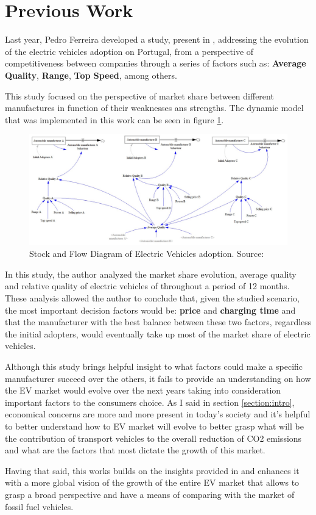 \section{Previous Work}
Last year, Pedro Ferreira developed a study, present in \cite{pedro-report}, addressing the evolution of the electric vehicles adoption on Portugal, from a perspective of competitiveness between companies through a series of factors such as: \textbf{Average Quality}, \textbf{Range}, \textbf{Top Speed}, among others.

This study focused on the perspective of market share between different manufactures in function of their weaknesses ans strengths. The dynamic model that was implemented in this work can be seen in figure \ref{fig:vensim-model-pedro}.

\begin{figure}[htbp]
\centerline{\includegraphics[width=0.9\linewidth]{img/vensim-model-pedro.png}}
\caption{Stock and Flow Diagram of Electric Vehicles adoption. Source: \cite{pedro-report}}
\label{fig:vensim-model-pedro}
\end{figure}

In this study, the author analyzed the market share evolution, average quality and relative quality of electric vehicles of throughout a period of 12 months. These analysis allowed the author to conclude that, given the studied scenario, the most important decision factors would be: \textbf{price} and \textbf{charging time} and that the manufacturer with the best balance between these two factors, regardless the initial adopters, would eventually take up most of the market share of electric vehicles.

Although this study brings helpful insight to what factors could make a specific manufacturer succeed over the others, it fails to provide an understanding on how the EV market would evolve over the next years taking into consideration important factors to the consumers choice. As I said in section \ref{section:intro}, economical concerns are more and more present in today's society and it's helpful to better understand how to EV market will evolve to better grasp what will be the contribution of transport vehicles to the overall reduction of CO2 emissions and what are the factors that most dictate the growth of this market. 

Having that said, this works builds on the insights provided in \cite{pedro-report} and enhances it with a more global vision of the growth of the entire EV market that allows to grasp a broad perspective and have a means of comparing with the market of fossil fuel vehicles.

\clearpage
